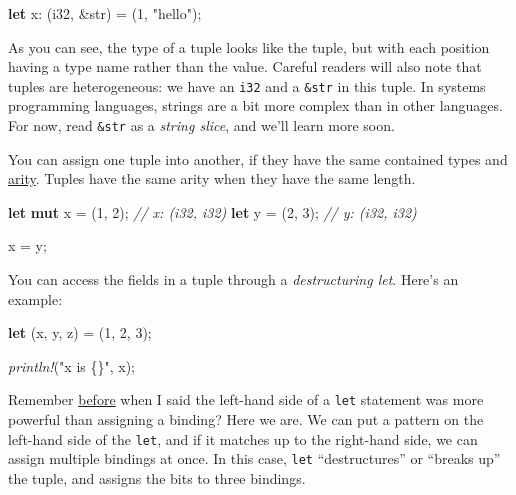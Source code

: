 \documentclass[a4paper,]{book}
\newenvironment{Shaded}{\begin{snugshade}}{\end{snugshade}}
\newcommand{\KeywordTok}[1]{\textcolor[rgb]{0.13,0.29,0.53}{\textbf{{#1}}}}
\newcommand{\DataTypeTok}[1]{\textcolor[rgb]{0.13,0.29,0.53}{{#1}}}
\newcommand{\DecValTok}[1]{\textcolor[rgb]{0.00,0.00,0.81}{{#1}}}
\newcommand{\StringTok}[1]{\textcolor[rgb]{0.31,0.60,0.02}{{#1}}}
\newcommand{\CommentTok}[1]{\textcolor[rgb]{0.56,0.35,0.01}{\textit{{#1}}}}
\newcommand{\PreprocessorTok}[1]{\textcolor[rgb]{0.56,0.35,0.01}{\textit{{#1}}}}
\newcommand{\NormalTok}[1]{{#1}}
\begin{document}
\begin{Shaded}
\begin{Highlighting}[]
\KeywordTok{let} \NormalTok{x: (}\DataTypeTok{i32}\NormalTok{, &}\DataTypeTok{str}\NormalTok{) = (}\DecValTok{1}\NormalTok{, }\StringTok{"hello"}\NormalTok{);}
\end{Highlighting}
\end{Shaded}

As you can see, the type of a tuple looks like the tuple, but with each
position having a type name rather than the value. Careful readers will
also note that tuples are heterogeneous: we have an \texttt{i32} and a
\texttt{\&str} in this tuple. In systems programming languages, strings
are a bit more complex than in other languages. For now, read
\texttt{\&str} as a \emph{string slice}, and we'll learn more soon.

You can assign one tuple into another, if they have the same contained
types and \protect\hyperlink{arity}{arity}. Tuples have the same arity
when they have the same length.

\begin{Shaded}
\begin{Highlighting}[]
\KeywordTok{let} \KeywordTok{mut} \NormalTok{x = (}\DecValTok{1}\NormalTok{, }\DecValTok{2}\NormalTok{); }\CommentTok{// x: (i32, i32)}
\KeywordTok{let} \NormalTok{y = (}\DecValTok{2}\NormalTok{, }\DecValTok{3}\NormalTok{); }\CommentTok{// y: (i32, i32)}

\NormalTok{x = y;}
\end{Highlighting}
\end{Shaded}

You can access the fields in a tuple through a \emph{destructuring let}.
Here's an example:

\begin{Shaded}
\begin{Highlighting}[]
\KeywordTok{let} \NormalTok{(x, y, z) = (}\DecValTok{1}\NormalTok{, }\DecValTok{2}\NormalTok{, }\DecValTok{3}\NormalTok{);}

\PreprocessorTok{println!}\NormalTok{(}\StringTok{"x is \{\}"}\NormalTok{, x);}
\end{Highlighting}
\end{Shaded}

Remember \protect\hyperlink{sec--variable-bindings}{before} when I said
the left-hand side of a \texttt{let} statement was more powerful than
assigning a binding? Here we are. We can put a pattern on the left-hand
side of the \texttt{let}, and if it matches up to the right-hand side,
we can assign multiple bindings at once. In this case, \texttt{let}
``destructures'' or ``breaks up'' the tuple, and assigns the bits to
three bindings.
\end{document}
